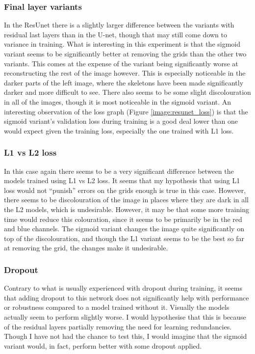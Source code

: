 \subsubsection{Final layer variants}
In the ResUnet there is a slightly larger difference between the variants with residual last layers than in the U-net, though that may still come down to variance in training. What is interesting in this experiment is that the sigmoid variant seems to be significantly better at removing the grids than the other two variants. This comes at the expense of the variant being significantly worse at reconstructing the rest of the image however. This is especially noticeable in the darker parts of the left image, where the skeletons have been made significantly darker and more difficult to see. There also seems to be some slight discolouration in all of the images, though it is most noticeable in the sigmoid variant. An interesting observation of the loss graph (Figure \ref{image:resunet_loss}) is that the sigmoid variant's validation loss during training is a good deal lower than one would expect given the training loss, especially the one trained with L1 loss.

\subsubsection{L1 vs L2 loss}
In this case again there seems to be a very significant difference between the models trained using L1 vs L2 loss. It seems that my hypothesis that using L1 loss would not ``punish'' errors on the grids enough is true in this case. However, there seems to be discolouration of the image in places where they are dark in all the L2 models, which is undesirable. However, it may be that some more training time would reduce this colouration, since it seems to be primarily be in the red and blue channels. The sigmoid variant changes the image quite significantly on top of the discolouration, and though the L1 variant seems to be the best so far at removing the grid, the changes make it undesirable.

\subsubsection{Dropout}
Contrary to what is usually experienced with dropout during training, it seems that adding dropout to this network does not significantly help with performance or robustness compared to a model trained without it. Visually the models actually seem to perform slightly worse. I would hypothesise that this is because of the residual layers partially removing the need for learning redundancies. Though I have not had the chance to test this, I would imagine that the sigmoid variant would, in fact, perform better with some dropout applied.

